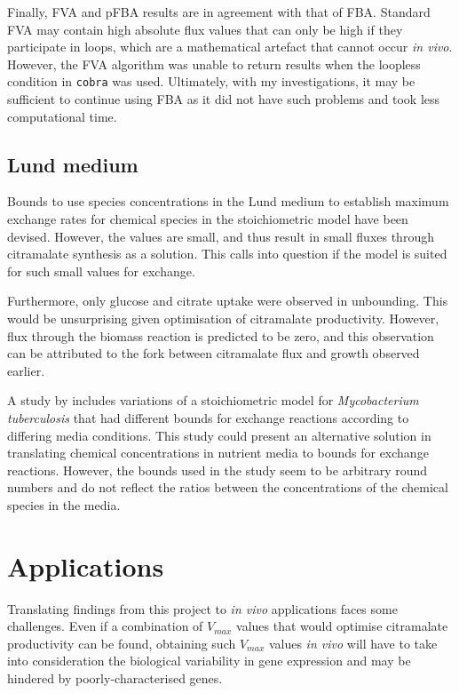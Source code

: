 \documentclass[parskip=full, numbers=noenddot]{scrreprt}
\begin{document}
Finally, FVA and pFBA results are in agreement with that of FBA. Standard FVA may contain high absolute flux values that can only be high if they participate in loops, which are a mathematical artefact that cannot occur \emph{in vivo}. However, the FVA algorithm was unable to return results when the loopless condition in \texttt{cobra} was used. Ultimately, with my investigations, it may be sufficient to continue using FBA as it did not have such problems and took less computational time.

\subsection{Lund medium}
\label{ssec:discussion-stoichiometric-lund}

Bounds to use species concentrations in the Lund medium to establish maximum exchange rates for chemical species in the stoichiometric model have been devised. However, the values are small, and thus result in small fluxes through citramalate synthesis as a solution. This calls into question if the model is suited for such small values for exchange.

Furthermore, only glucose and citrate uptake were observed in unbounding. This would be unsurprising given optimisation of citramalate productivity. However, flux through the biomass reaction is predicted to be zero, and this observation can be attributed to the fork between citramalate flux and growth observed earlier.

A study by \citet{kavvas_updated_2018} includes variations of a stoichiometric model for \emph{Mycobacterium tuberculosis} that had different bounds for exchange reactions according to differing media conditions. This study could present an alternative solution in translating chemical concentrations in nutrient media to bounds for exchange reactions. However, the bounds used in the study seem to be arbitrary round numbers and do not reflect the ratios between the concentrations of the chemical species in the media.

\section{Applications}
\label{sec:discussion-applications}

Translating findings from this project to \emph{in vivo} applications faces some challenges. Even if a combination of $V_{max}$ values that would optimise citramalate productivity can be found, obtaining such $V_{max}$ values \emph{in vivo} will have to take into consideration the biological variability in gene expression and may be hindered by poorly-characterised genes.
\end{document}

